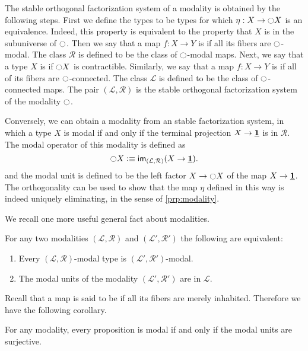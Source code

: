 \documentclass[9pt,twosided]{amsart}
\begin{document}
The stable orthogonal factorization system of a modality is obtained by the following steps. First we define the  types to be types for which $\eta:X\to{\ensuremath{\ocircle}} X$ is an equivalence. Indeed, this property is equivalent to the property that $X$ is in the subuniverse of ${\ocircle}$. Then we say that a map $f:X\to Y$ is  if all its fibers are ${\ocircle}$-modal. The class $\mathcal{R}$ is defined to be the class of ${\ocircle}$-modal maps. Next, we say that a type $X$ is  if ${\ocircle} X$ is contractible. Similarly, we say that a map $f:X\to Y$ is  if all of its fibers are ${\ocircle}$-connected. The class $\mathcal{L}$ is defined to be the class of ${\ocircle}$-connected maps. The pair $(\mathcal{L},\mathcal{R})$ is the stable orthogonal factorization system of the modality ${\ocircle}$.

Conversely, we can obtain a modality from an stable factorization system, in which a type $X$ is modal if and only if the terminal projection $X\to \underline{\mathbf{1}}$ is in $\mathcal{R}$. The modal operator of this modality is defined as
\begin{equation*}
{\ensuremath{\ocircle}} X \vcentcolon\equiv \mathsf{im}_{(\mathcal{L},\mathcal{R})}(X\to \underline{\mathbf{1}}).
\end{equation*}
and the modal unit is defined to be the left factor $X \to {\ensuremath{\ocircle}} X$ of the map $X\to \underline{\mathbf{1}}$. The orthogonality can be used to show that the map $\eta$ defined in this way is indeed uniquely eliminating, in the sense of \cref{prp:modality}.

We recall one more useful general fact about modalities.

\begin{thm}
  For any two modalities $(\mathcal{L},\mathcal{R})$ and $(\mathcal{L}',\mathcal{R}')$ the following are equivalent:
\begin{enumerate}
\item Every $(\mathcal{L},\mathcal{R})$-modal type is $(\mathcal{L}',\mathcal{R}')$-modal.
\item The modal units of the modality $(\mathcal{L}',\mathcal{R}')$ are in $\mathcal{L}$.
\end{enumerate}
\end{thm}

Recall that a map is said to be  if all its fibers are merely inhabited. Therefore we have the following corollary.

\begin{cor}\label{cor:units-surjective}
  For any modality, every proposition is modal if and only if the modal units are surjective.
\end{cor}
\end{document}
